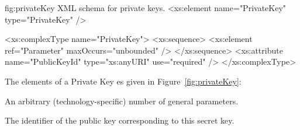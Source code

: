 \begin{xml}
{fig:privateKey}
{XML schema for private keys.}
<xs:element name="PrivateKey" type="PrivateKey" />

<xs:complexType name="PrivateKey">
  <xs:sequence>
    <xs:element ref="Parameter" maxOccurs="unbounded" />
  </xs:sequence>
  <xs:attribute name="PublicKeyId" type="xs:anyURI" use="required" />
</xs:complexType>
\end{xml}

\vspace{3pt}\noindent The elements of a Private Key es given in Figure~\ref{fig:privateKey}:
\begin{parameter}
An arbitrary (technology-specific) number of general parameters.
\end{parameter}
\begin{parameter}
The identifier of the public key corresponding to this secret key. 
\end{parameter}



